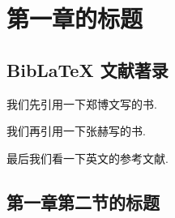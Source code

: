 
\chapter{第一章的标题}

\zhlipsum[1]

\section{BibLaTeX 文献著录}

\zhlipsum[1]

我们先引用一下郑博文写的书\cite{rudin1976principleschinese3}.

我们再引用一下张赫写的书\cite{rudin1976principleschinese}.

最后我们看一下英文的参考文献\cite{rudin1976principles}.

\section{第一章第二节的标题}

\zhlipsum
